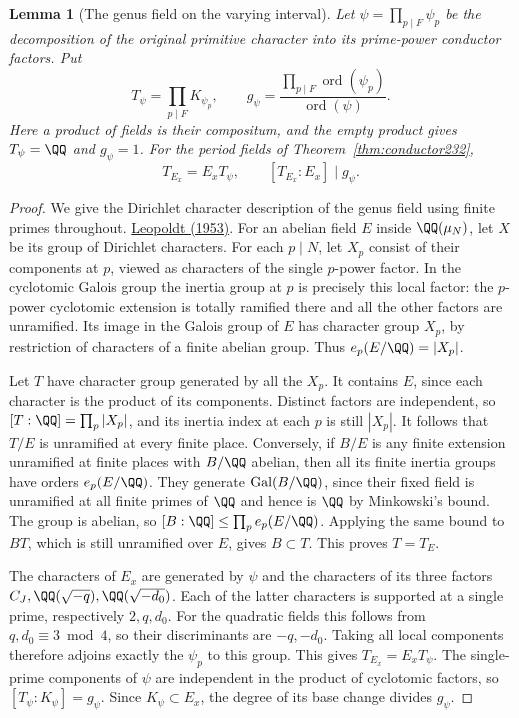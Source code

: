 \documentclass[a4paper,11pt]{article}
\newtheorem{lemma}[proposition]{Lemma}
\theoremstyle{definition}
\theoremstyle{remark}
\numberwithin{equation}{section}
\begin{document}
\begin{lemma}[The genus field on the varying interval]
\leavevmode\label{lem:genusfield601}
Let \(\psi=\prod_{p\mid F}\psi_p\) be the decomposition
of the original primitive character into its prime-power
conductor factors. Put
\[
   T_\psi=\prod_{p\mid F} K_{\psi_p},\qquad
   g_\psi=\frac{\prod_{p\mid F}\operatorname{ord}(\psi_p)}
                   {\operatorname{ord}(\psi)} .
\]
Here a product of fields is their compositum, and the
empty product gives \(T_\psi=\QQ\) and \(g_\psi=1\).
For the period fields of Theorem~\ref{thm:conductor232},
\[
        T_{E_x}=E_xT_\psi,\qquad [T_{E_x}:E_x]\mid g_\psi .
\]
\end{lemma}
\begin{proof}
We give the Dirichlet character description of the genus
field using finite primes throughout.
\href{https://doi.org/10.1002/mana.19530090604}{Leopoldt (1953)}.
For an abelian field \(E\) inside \(\QQ(\mu_N)\), let
\(X\) be its group of Dirichlet characters. For each
\(p\mid N\), let \(X_p\) consist of their components at
\(p\), viewed as characters of the single \(p\)-power
factor. In the cyclotomic Galois group the inertia group
at \(p\) is precisely this local factor: the \(p\)-power
cyclotomic extension is totally ramified there and all
the other factors are unramified. Its image in the
Galois group of \(E\) has character group \(X_p\), by
restriction of characters of a finite abelian group.
Thus \(e_p(E/\QQ)=|X_p|\).

Let \(T\) have character group generated by all the \(X_p\).
It contains \(E\), since each character is the product of
its components. Distinct factors are independent, so
\([T:\QQ]=\prod_p |X_p|\), and its inertia index at
each \(p\) is still \(|X_p|\). It follows that \(T/E\)
is unramified at every finite place. Conversely, if
\(B/E\) is any finite extension unramified at finite
places with \(B/\QQ\) abelian, then all its finite
inertia groups have orders \(e_p(E/\QQ)\). They generate
\(\operatorname{Gal}(B/\QQ)\), since their fixed field
is unramified at all finite primes of \(\QQ\) and hence
is \(\QQ\) by Minkowski's bound. The group is abelian,
so \([B:\QQ]\le\prod_p e_p(E/\QQ)\). Applying the same
bound to \(BT\), which is still unramified over \(E\),
gives \(B\subset T\). This proves \(T=T_E\).

The characters of \(E_x\) are generated by \(\psi\)
and the characters of its three factors
\(C_J,\QQ(\sqrt{-q}),\QQ(\sqrt{-d_0})\).
Each of the latter characters is supported at a single
prime, respectively \(2,q,d_0\). For the quadratic
fields this follows from \(q,d_0\equiv3\bmod4\), so
their discriminants are \(-q,-d_0\). Taking all
local components therefore adjoins exactly the
\(\psi_p\) to this group. This gives \(T_{E_x}=E_xT_\psi\).
The single-prime components of \(\psi\) are independent
in the product of cyclotomic factors, so
\([T_\psi:K_\psi]=g_\psi\). Since \(K_\psi\subset E_x\),
the degree of its base change divides \(g_\psi\).
\end{proof}
\end{document}
